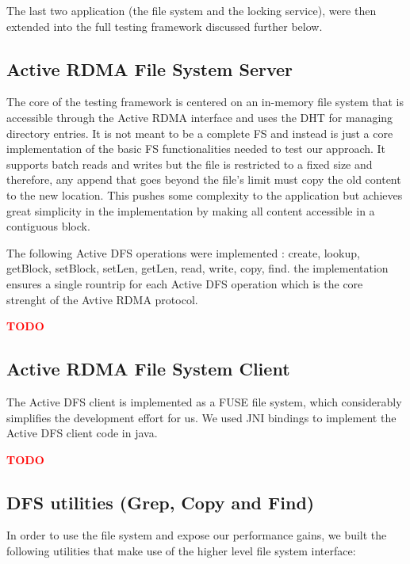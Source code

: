 \documentclass[10pt]{article}
\newcommand{\PROBLEM}[1] {\textbf{\textcolor{red}{#1}}}
\begin{document}
The last two application (the file system and the locking service), were then extended into the full testing framework discussed further below.

\subsection{Active RDMA File System Server}

The core of the testing framework is centered on an in-memory file system that is accessible through the Active RDMA interface and uses the DHT for managing directory entries. It is not meant to be a complete FS and instead is just a core implementation of the basic FS functionalities needed to test our approach. It supports batch reads and writes but the file is restricted to a fixed size and therefore, any append that goes beyond the file's limit must copy the old content to the new location. This pushes some complexity to the application but achieves great simplicity in the implementation by making all content accessible in a contiguous block.

The following Active DFS operations were implemented : create, lookup, getBlock, setBlock, setLen, getLen, read, write, copy, find. the implementation ensures a single rountrip for each Active DFS operation which is the core strenght of the Avtive RDMA protocol.

\PROBLEM{TODO}

\subsection{Active RDMA File System Client}

The Active DFS client is implemented as a FUSE file system, which considerably simplifies the development effort for us. We used JNI bindings to implement the Active DFS client code in java.

\PROBLEM{TODO}

\subsection{DFS utilities (Grep, Copy and Find)}

In order to use the file system and expose our performance gains, we built the following utilities that make use of the higher level file system interface:
\end{document}
